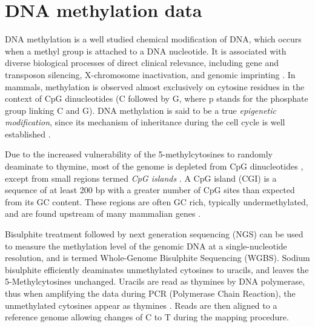 \section{DNA methylation data} \label{dna-methylation-data-sect}

DNA methylation is a well studied chemical modification of DNA, which occurs when a methyl group is attached to a DNA nucleotide. It is associated with diverse biological processes of direct clinical relevance, including gene and transposon silencing, X-chromosome inactivation, and  genomic imprinting \citep{Li1993, Mohandas1981}. In mammals,  methylation is observed almost exclusively on cytosine residues in the context of CpG dinucleotides (\ie C followed by G, where p stands for the phosphate group linking C and G). DNA methylation is said to be a true \emph{epigenetic modification}, since its mechanism of inheritance during the cell cycle is well established \citep{Law2010}. 

Due to the increased vulnerability of the 5-methylcytosines to randomly deaminate to thymine, most of the genome is depleted from CpG dinucleotides \citep{Scarano1967}, except from small regions termed \emph{CpG islands} \citep{Bird2002}. A CpG island (CGI) is a sequence of at least 200 bp with a greater number of CpG sites than expected from its GC content. These regions are often GC rich, typically undermethylated, and are found upstream of many mammalian genes \citep{Law2010}. 

Bisulphite treatment \citep{Frommer1992} followed by next generation sequencing (NGS) can be used to measure the methylation level of the genomic DNA at a single-nucleotide resolution, and is termed Whole-Genome Bisulphite Sequencing (WGBS). Sodium bisulphite efficiently deaminates unmethylated cytosines to uracils, and leaves the 5-Methylcytosines unchanged. Uracils are read as thymines by DNA polymerase, thus when amplifying the data during PCR (Polymerase Chain Reaction), the unmethylated cytosines appear as thymines \citep{Krueger2012}. Reads are then aligned to a reference genome allowing changes of C to T during the mapping procedure. 


